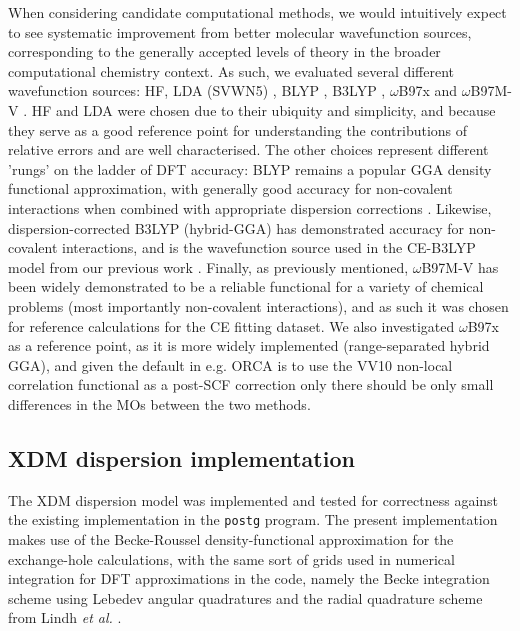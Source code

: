 \documentclass[preprint]{iucr}              %
\begin{document}
When considering candidate computational methods, we would intuitively expect to see systematic improvement from better 
molecular wavefunction sources, corresponding to the generally accepted levels of theory in the broader computational 
chemistry context. As such, we evaluated several different wavefunction sources:
HF, LDA (SVWN5) \cite{Dirac1930,Bloch1929,Vosko1980}, BLYP \cite{Becke1988Func, Lee1988Func, Miehlich1989}, 
B3LYP \cite{Stephens1994}, $\omega$B97x \cite{Chai2008} and $\omega$B97M-V \cite{Mardirossian2016}.
HF and LDA were chosen due to their ubiquity and simplicity, and because they serve as a good reference point
for understanding the contributions of relative errors and are well characterised. 
The other choices represent different 'rungs' on the ladder of DFT accuracy: BLYP remains a popular GGA density 
functional approximation, with generally good accuracy for non-covalent interactions when combined with 
appropriate dispersion corrections \cite{Goerigk2017}. 
Likewise, dispersion-corrected B3LYP (hybrid-GGA) has demonstrated accuracy for 
non-covalent interactions, and is the wavefunction source used
in the CE-B3LYP model from our previous work \cite{Mackenzie2017}. Finally, as previously mentioned,
$\omega$B97M-V has been widely demonstrated to be a reliable functional for a  variety of chemical problems 
(most importantly non-covalent interactions)\cite{Najibi2018}, and as such it was chosen for reference 
calculations for the CE fitting dataset. We also investigated $\omega$B97x as a reference point, as it is more widely
implemented (range-separated hybrid GGA), and given the default in e.g. ORCA is to use
the VV10 \cite{Vydrov2010} non-local correlation functional as a post-SCF correction only there should be
only small differences in the MOs between the two methods.

\subsection{XDM dispersion implementation}
\label{sec:XDM}

The XDM dispersion model was implemented and tested for correctness against the existing implementation 
in the \texttt{postg} program.\cite{Otero-de-la-Roza2013,Kannemann2010}
The present implementation makes use of the Becke-Roussel \cite{Becke1989,Proynov2008} density-functional 
approximation for the exchange-hole calculations, with the same sort of grids used in numerical integration
for DFT approximations in the code, namely the Becke integration scheme \cite{Becke1988} using Lebedev \cite{Lebedev1976}
angular quadratures and the radial quadrature scheme from Lindh \textit{et al.} \cite{Lindh2001}.
\end{document}
